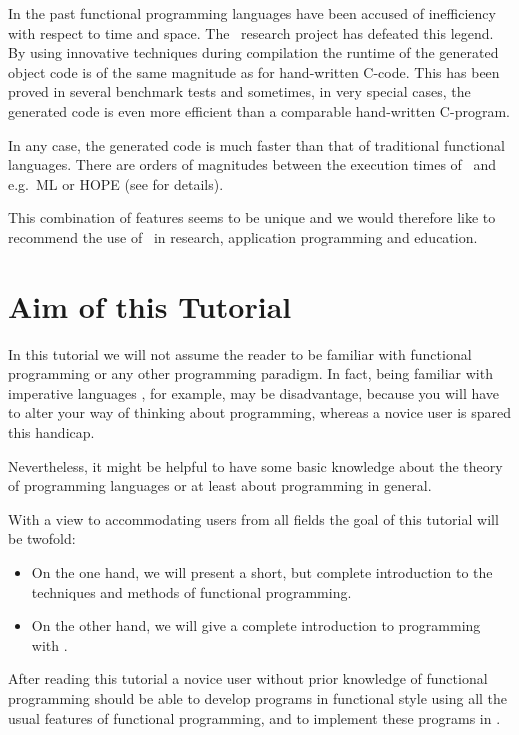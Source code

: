 In the past functional programming languages have been accused of 
inefficiency with respect to time and space. 
The \opal\ research project has defeated this legend.
By using innovative techniques during compilation the runtime of the
generated object code is of the same magnitude as for hand-written C-code.
This has been proved in  several benchmark tests and sometimes, in very
special cases, the generated code is even more efficient than a
comparable hand-written C-program. 

In any case, the generated code is much faster than that of traditional
functional languages. There are orders of magnitudes between the
execution times of \opal\ and e.g.~ML
or HOPE (see \cite{SchGr} for details).
\medskip


This combination of features seems to be unique and we would
therefore like
to re\-commend the use of \opal\ in research, application programming and
education.
 

\section{Aim of this Tutorial}
\label{sec:aim}

In this tutorial we will not assume the reader to be familiar with
functional programming or any other programming paradigm.
In fact, being familiar with imperative languages , for example, may
be disadvantage, because you will have to alter your way of thinking
about programming,  whereas a novice user is spared this handicap.

Nevertheless, it might be helpful  to have some basic
knowledge about the theory of programming languages or at least about
programming in general. 

\smallskip

With a view to accommodating users from all fields  the goal of this
tutorial will be twofold:
\begin{itemize}
\item On the one hand, we will present a short, but complete
  introduction to the techniques and methods of functional
  programming.
\item On the other hand, we will give a complete introduction to
  programming with \opal.
\end{itemize}
After reading this tutorial a novice user without prior knowledge of
functional programming should be able to develop programs in
functional style using all the usual features of functional programming,
and to implement these programs in \opal.

